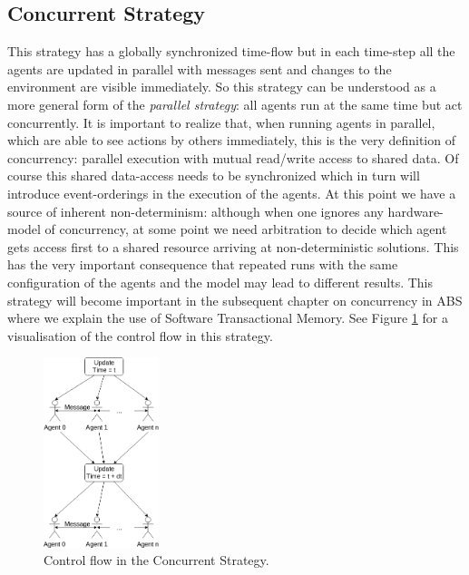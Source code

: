 \subsection{Concurrent Strategy}
This strategy has a globally synchronized time-flow but in each time-step all the agents are updated in parallel with messages sent and changes to the environment are visible immediately. So this strategy can be understood as a more general form of the \textit{parallel strategy}: all agents run at the same time but act concurrently. It is important to realize that, when running agents in parallel, which are able to see actions by others immediately, this is the very definition of concurrency: parallel execution with mutual read/write access to shared data. Of course this shared data-access needs to be synchronized which in turn will introduce event-orderings in the execution of the agents. At this point we have a source of inherent non-determinism: although when one ignores any hardware-model of concurrency, at some point we need arbitration to decide which agent gets access first to a shared resource arriving at non-deterministic solutions. This has the very important consequence that repeated runs with the same configuration of the agents and the model may lead to different results. This strategy will become important in the subsequent chapter on concurrency in ABS where we explain the use of Software Transactional Memory. See Figure \ref{fig:strategy_conc} for a visualisation of the control flow in this strategy.

\begin{figure}[H]
	\centering
	\includegraphics[width=0.3\textwidth, angle=0]{./fig/fpabs/timedriven/concurrent.png}
	\caption{Control flow in the Concurrent Strategy.}
	\label{fig:strategy_conc}
\end{figure}

